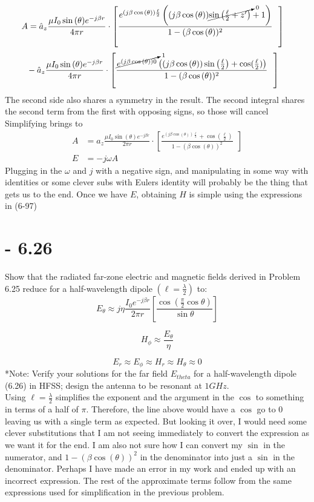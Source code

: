 \documentclass[12pt]{article}
\begin{document}
\begin{align*}
  A &=\hat{a}_z\frac{\mu I_0\sin{(\theta)}e^{-j\beta r}}{4\pi r}\cdot \left[\frac {e^{(j\beta \cos{(\theta)})\frac{\ell}{2}}  \left((j\beta \cos{(\theta)})
      \cancelto{0}{\sin{\left(\frac{\ell}{2}+z'\right)}  } + 1\right)
      }{1-(\beta\cos{(\theta)})^{2}}\ \ \right]
\end{align*} 
\begin{align*}
   &-\hat{a}_z\frac{\mu I_0\sin{(\theta)}e^{-j\beta r}}{4\pi r}\cdot \left[\frac {\cancelto{1}{e^{(j\beta \cos{(\theta)})0}}  \left((j\beta \cos{(\theta)})
      \sin{\left(\frac{\ell}{2}\right)}  + \cos(\frac{\ell}{2})\right)
      }{1-(\beta\cos{(\theta)})^{2}}\ \ \right]
\end{align*}
The second side also shares a symmetry in the result. The second integral shares the second term from the first with opposing signs, so those will cancel Simplifying brings to
\begin{align*}
  A &= \hat{a}_z\frac{\mu I_0\sin{(\theta)}e^{-j\beta r}}{2\pi r}\cdot \left[\frac {e^{(j\beta \cos{(\theta)})\frac{\ell}{2}} + \cos\left(\frac{\ell}{2}\right)
      }{1-(\beta\cos{(\theta)})^{2}}\ \ \right]\\
  E &= -j\omega A
\end{align*}
Plugging in the $\omega$ and $j$ with a negative sign, and manipulating in some way with identities or some clever subs with Eulers identity will probably be the thing that gets us to the end. Once we have $E$, obtaining $H$ is simple using the expressions in (6-97)   
\section{- 6.26}
 Show that the radiated far-zone electric and magnetic fields derived in Problem 6.25 reduce for a half-wavelength dipole $(\ell = \frac{\lambda}{2})$ to:
\[
E_{\theta} \approx j \eta \frac{I_0 e^{-j \beta r}}{2\pi r} 
\left[\frac{\cos\left(\frac{\pi}{2} \cos \theta\right)}{
\sin \theta}\right]
\]

\[
H_{\phi} \approx \frac{E_{\theta}}{\eta}
\]

\[
E_r \approx E_{\phi} \approx H_r \approx H_{\theta} \approx 0
\]
*Note: Verify your solutions for the far field $E_{theta}$ for a half-wavelength dipole (6.26) in HFSS; design the antenna to be resonant at $1GHz$.\\

Using $\ell = \frac{\lambda}{2}$ simplifies the exponent and the argument in the $\cos$ to something in terms of a half of $\pi$. Therefore, the line above would have a $\cos$ go to $0$ leaving us with a single term as expected. But looking it over, I would need some clever substitutions that I am not seeing immediately to convert the expression as we want it for the end. I am also not sure how I can convert my $\sin$ in the numerator, and $1-(\beta\cos(\theta))^2$ in the denominator into just a $\sin$ in the denominator. Perhaps I have made an error in my work and ended up with an incorrect expression. The rest of the approximate terms follow from the same expressions used for simplification in the previous problem. 
\end{document}
